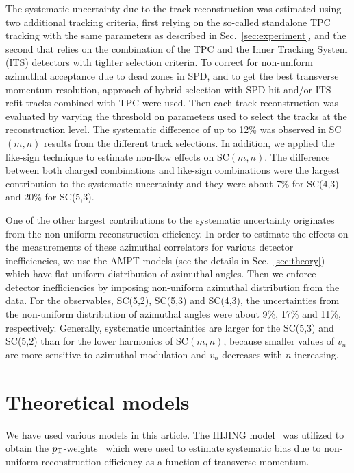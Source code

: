 The systematic uncertainty due to the track reconstruction was estimated using two additional tracking criteria, first relying on the so-called standalone TPC tracking with the 
same parameters as described in Sec.~\ref{sec:experiment}, and the second that relies on the combination of the TPC and the Inner Tracking System (ITS) detectors with tighter selection criteria.
To correct for non-uniform azimuthal acceptance due to dead zones in SPD, and to get the best transverse momentum resolution, approach of hybrid selection with SPD hit and/or ITS refit tracks combined with TPC were used. Then each track reconstruction was evaluated by varying the threshold on parameters used to select the tracks at the reconstruction level. 
The systematic difference of up to 12\% was observed in SC$(m,n)$ results from the different track selections. 
In addition, we applied the like-sign technique to estimate non-flow effects on SC$(m,n)$. The difference between both charged combinations and like-sign combinations were the largest contribution to the systematic uncertainty and they were about 7\% for SC(4,3) and 20\% for SC(5,3). 

One of the other largest contributions to the systematic uncertainty originates from the non-uniform reconstruction efficiency. In order to estimate the effects on the measurements of these azimuthal correlators for various detector inefficiencies, we use the AMPT models (see the details in Sec.~\ref{sec:theory}) which have flat uniform distribution of azimuthal angles. Then we enforce detector inefficiencies by imposing non-uniform azimuthal distribution from the data. For the observables, SC(5,2), SC(5,3) and SC(4,3), the uncertainties from the non-uniform distribution of azimuthal angles were about 9\%, 17\% and 11\%, respectively.
Generally, systematic uncertainties are larger for the SC(5,3) and SC(5,2) than for the lower harmonics of SC$(m,n)$, because smaller values of $v_n$ are more sensitive to azimuthal modulation and $v_n$ decreases with $n$ increasing. 

\section{Theoretical models}
\label{sec:models}
We have used various models in this article. The {\sc HIJING} model~\cite{Wang:1991hta,Gyulassy:1994ew} was utilized to obtain the $p_{\rm T}$-weights~\cite{Bilandzic:2013kga} which were used to estimate systematic bias due to non-uniform reconstruction efficiency as a function of transverse momentum. 

